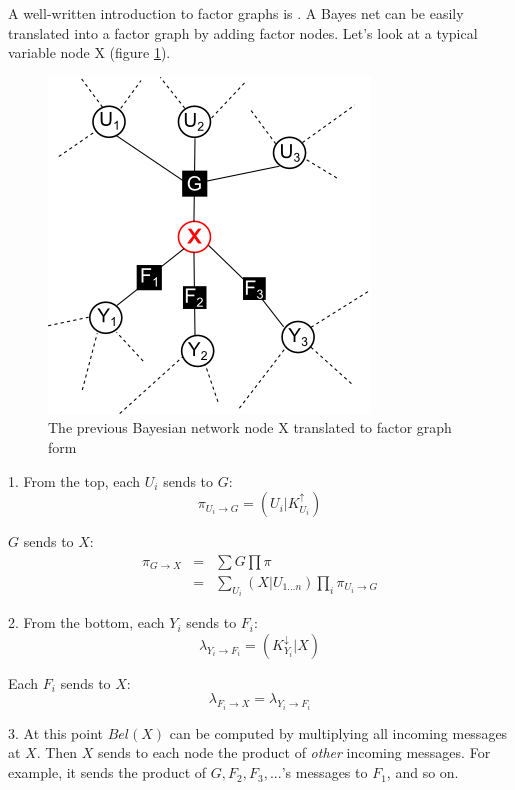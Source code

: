 A well-written introduction to factor graphs is \citep*{Kschischang2001}.  A Bayes net can
be easily translated into a factor graph by adding factor nodes.  Let's look at a typical
variable node X (figure \ref{fig:factor-graph-typical-node}).

\begin{figure}[h]
\centering
\includegraphics{factor-graph-typical-node.png}
\caption{The previous Bayesian network node X translated to factor graph form}
\label{fig:factor-graph-typical-node}
\end{figure}

1. From the top, each $U_i$ sends to $G$:
\begin{equation}
\pi_{U_i \rightarrow G} = (U_i | K^\uparrow_{U_i})
\end{equation}

\tab $G$ sends to $X$:
\begin{eqnarray}
\pi_{G \rightarrow X} &=& \sum G \prod \pi                 \nonumber \\
                      &=& \sum_{U_i} (X|U_{1...n}) \prod_i \pi_{U_i \rightarrow G}
\end{eqnarray}

2. From the bottom, each $Y_i$ sends to $F_i$:
\begin{equation}
\lambda_{Y_i \rightarrow F_i} = (K^\downarrow_{Y_i} | X)
\end{equation}

\tab Each $F_i$ sends to $X$:
\begin{equation}
\lambda_{F_i \rightarrow X} = \lambda_{Y_i \rightarrow F_i}
\end{equation}

3. At this point $Bel(X)$ can be computed by multiplying all incoming messages at $X$.  Then $X$
 sends to each node the product of \textit{other} incoming messages.  For example,
 it sends the product of $G, F_2, F_3, ...$'s messages to $F_1$, and so on.

